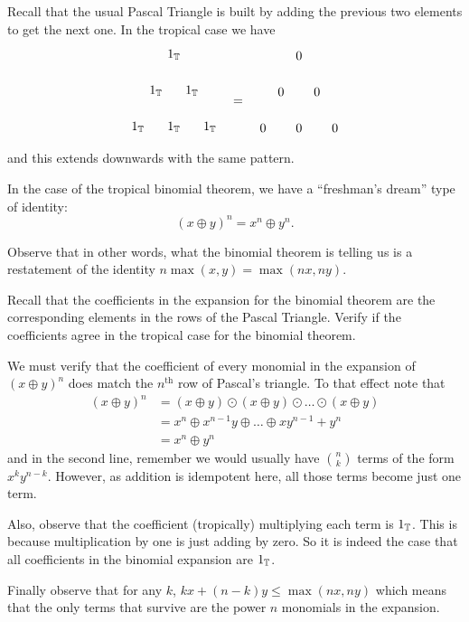 \documentclass[12pt]{memoir}
\begin{document}
\begin{Prop}
Recall that the usual Pascal Triangle is built by adding the previous two elements to get the next one. In the tropical case we have 
$$
\begin{tikzpicture}
    \foreach \n in {0,...,2} {
      \foreach \k in {0,...,\n} {
        \node at (\k-\n/2,-\n) {$1_\bT$};
      }
    }
    \end{tikzpicture}
    \word{\raisebox{2.5em}{=}}%
    \begin{tikzpicture}
        \foreach \n in {0,...,2} {
          \foreach \k in {0,...,\n} {
            \node at (\k-\n/2,-\n) {$0$};
          }
        }
        \end{tikzpicture}
    $$
    and this extends downwards with the same pattern.\par 
    In the case of the tropical binomial theorem, we have a ``freshman's dream'' type of identity:
    $$(x\oplus y)^n=x^n\oplus y^n.$$

Observe that in other words, what the binomial theorem is telling us is a restatement of the identity $n\max(x,y)=\max(nx,ny)$.
\end{Prop}

\begin{Ej}[2]
Recall that the coefficients in the expansion for the binomial theorem are the corresponding elements in the rows of the Pascal Triangle. Verify if the coefficients agree in the tropical case for the binomial theorem.
\end{Ej}

\begin{ptcb}
We must verify that the coefficient of every monomial in the expansion of $(x\oplus y)^n$ does match the $n^{\text{th}}$ row of Pascal's triangle. To that effect note that 
\begin{align*}
    (x\oplus y)^n&=(x\oplus y)\odot(x\oplus y)\odot\dots\odot(x\oplus y)\\
    &=x^n\oplus x^{n-1}y\oplus\dots\oplus xy^{n-1}+y^n\\
    &=x^n\oplus y^n
\end{align*}
and in the second line, remember we would usually have $\binom{n}{k}$ terms of the form $x^ky^{n-k}$. However, as addition is idempotent here, all those terms become just one term.\par 
Also, observe that the coefficient (tropically) multiplying each term is $1_{\mathbb{T}}$. This is because multiplication by one is just adding by zero. So it is indeed the case that all coefficients in the binomial expansion are $1_{\mathbb{T}}$.\par 
Finally observe that for any $k$, $kx+(n-k)y\leq\max(nx,ny)$ which means that the only terms that survive are the power $n$ monomials in the expansion. 
\end{ptcb}
\end{document}
